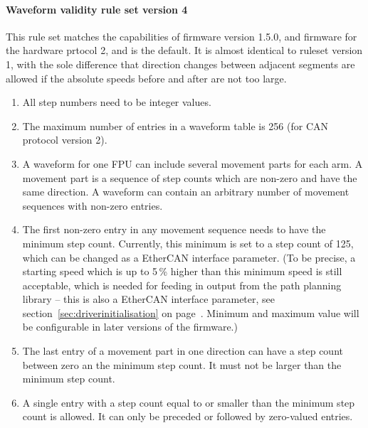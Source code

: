 \documentclass[fontsize=12,a4paper]{scrreprt}
\begin{document}
\paragraph{Waveform validity rule set version 4}
\label{sec:wfrulesetv4}

This rule set matches the capabilities of firmware version 1.5.0, and
firmware for the hardware prtocol 2, and is the default. It is almost
identical to ruleset version 1, with the sole difference that
direction changes between adjacent segments are allowed if the
absolute speeds before and after are not too large.


\begin{enumerate}

\item All step numbers need to be integer values.

\item The maximum number of entries in a waveform table is 256 (for
  CAN protocol version 2).

\item A waveform for one FPU can include several movement parts for
  each arm. A movement part is a sequence of step counts which are
  non-zero and have the same direction.  A waveform can contain an
  arbitrary number of movement sequences with non-zero entries.

\item The first non-zero entry in any movement sequence needs to have
  the minimum step count.  Currently, this minimum is set to a step
  count of 125, which can be changed as a EtherCAN interface parameter. (To be
  precise, a starting speed which is up to 5\,\% higher than this
  minimum speed is still acceptable, which is needed for feeding in
  output from the path planning library -- this is also a EtherCAN interface
  parameter, see section~\ref{sec:driverinitialisation} on
  page~\pageref{sec:driverinitialisation}. Minimum and maximum value
  will be configurable in later versions of the firmware.)

\item The last entry of a movement part in one direction can have a
  step count between zero an the minimum step count. It must not be
  larger than the minimum step count.

\item A single entry with a step count equal to or smaller than the
  minimum step count is allowed. It can only be preceded or followed
  by zero-valued entries.


\end{enumerate}
\end{document}

